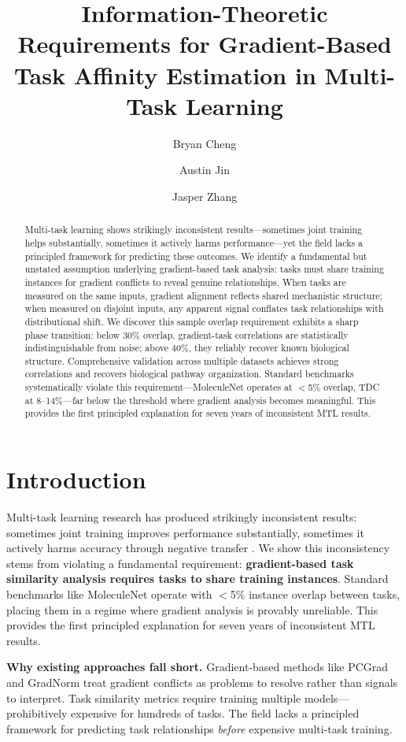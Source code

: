 \documentclass[sigconf,nonacm]{acmart}
\title{Information-Theoretic Requirements for Gradient-Based Task Affinity Estimation in Multi-Task Learning}
\author{Bryan Cheng}
\affiliation{%
  \institution{Great Neck South High School}
  \city{Great Neck}
  \state{New York}
  \country{USA}
}
\author{Austin Jin}
\affiliation{%
  \institution{Great Neck South High School}
  \city{Great Neck}
  \state{New York}
  \country{USA}
}
\author{Jasper Zhang}
\affiliation{%
  \institution{Great Neck South High School}
  \city{Great Neck}
  \state{New York}
  \country{USA}
}
\begin{document}
\begin{abstract}
Multi-task learning shows strikingly inconsistent results---sometimes joint training helps substantially, sometimes it actively harms performance---yet the field lacks a principled framework for predicting these outcomes. We identify a fundamental but unstated assumption underlying gradient-based task analysis: tasks must share training instances for gradient conflicts to reveal genuine relationships. When tasks are measured on the same inputs, gradient alignment reflects shared mechanistic structure; when measured on disjoint inputs, any apparent signal conflates task relationships with distributional shift. We discover this sample overlap requirement exhibits a sharp phase transition: below 30\% overlap, gradient-task correlations are statistically indistinguishable from noise; above 40\%, they reliably recover known biological structure. Comprehensive validation across multiple datasets achieves strong correlations and recovers biological pathway organization. Standard benchmarks systematically violate this requirement---MoleculeNet operates at $<$5\% overlap, TDC at 8--14\%---far below the threshold where gradient analysis becomes meaningful. This provides the first principled explanation for seven years of inconsistent MTL results.
\end{abstract}

\maketitle

\section{Introduction}

Multi-task learning research has produced strikingly inconsistent results: sometimes joint training improves performance substantially, sometimes it actively harms accuracy through negative transfer \cite{fifty2021efficiently, wang2019negative}. We show this inconsistency stems from violating a fundamental requirement: \textbf{gradient-based task similarity analysis requires tasks to share training instances}. Standard benchmarks like MoleculeNet \cite{wu2018moleculenet} operate with $<$5\% instance overlap between tasks, placing them in a regime where gradient analysis is provably unreliable. This provides the first principled explanation for seven years of inconsistent MTL results.

\textbf{Why existing approaches fall short.} Gradient-based methods like PCGrad \cite{yu2020gradient} and GradNorm \cite{chen2018gradnorm} treat gradient conflicts as problems to resolve rather than signals to interpret. Task similarity metrics \cite{zamir2018taskonomy, fifty2021efficiently, standley2020tasks} require training multiple models---prohibitively expensive for hundreds of tasks. The field lacks a principled framework for predicting task relationships \textit{before} expensive multi-task training.
\end{document}
